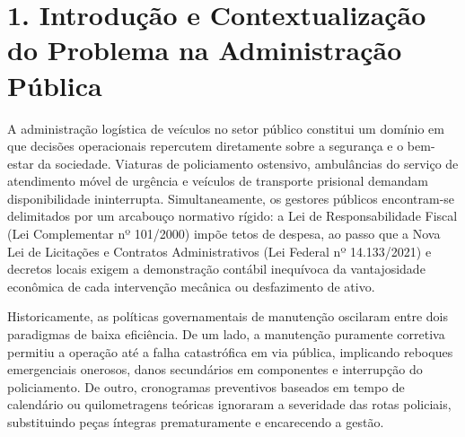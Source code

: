 \documentclass[10pt,a4paper,journal]{article}
\begin{document}
\begin{abstract}
economia plurianual acumulada de R\$ 40.088.374,00 no triênio 2027 a 2029 sob desgaste físico de Weibull e inflação setorial de 6,08\% ao ano, identificando 313 veículos com manutenção acumulada superior a 40\% do valor venal FIPE para desincorporação e leilão com fulcro no Art. 5º do Decreto Estadual nº 47.539/2018.

**Palavras-chave:** Analítica Prescritiva; Programação Linear Inteira Mista; Calibração em Aprendizado de Máquina; Gestão de Frotas Públicas; Custo Total de Propriedade; Governança Algorítmica.

\end{abstract}

\section{1. Introdução e Contextualização do Problema na Administração Pública}
A administração logística de veículos no setor público constitui um domínio em que decisões operacionais repercutem diretamente sobre a segurança e o bem-estar da sociedade. Viaturas de policiamento ostensivo, ambulâncias do serviço de atendimento móvel de urgência e veículos de transporte prisional demandam disponibilidade ininterrupta. Simultaneamente, os gestores públicos encontram-se delimitados por um arcabouço normativo rígido: a Lei de Responsabilidade Fiscal (Lei Complementar nº 101/2000) impõe tetos de despesa, ao passo que a Nova Lei de Licitações e Contratos Administrativos (Lei Federal nº 14.133/2021) e decretos locais exigem a demonstração contábil inequívoca da vantajosidade econômica de cada intervenção mecânica ou desfazimento de ativo.

Historicamente, as políticas governamentais de manutenção oscilaram entre dois paradigmas de baixa eficiência. De um lado, a manutenção puramente corretiva permitiu a operação até a falha catastrófica em via pública, implicando reboques emergenciais onerosos, danos secundários em componentes e interrupção do policiamento. De outro, cronogramas preventivos baseados em tempo de calendário ou quilometragens teóricas ignoraram a severidade das rotas policiais, substituindo peças íntegras prematuramente e encarecendo a gestão.
\end{document}
